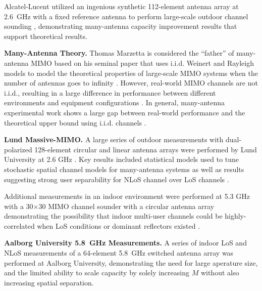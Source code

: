	Alcatel-Lucent utilized an ingenious synthetic 112-element antenna array at 2.6~GHz with a fixed reference antenna to perform large-scale outdoor channel sounding \cite{hoydis2012channel}, demonstrating many-antenna capacity improvement results that support theoretical results.




\textbf{Many-Antenna Theory.}
	Thomas Marzetta is considered the ``father'' of many-antenna \ac{MIMO} based on his seminal paper that uses i.i.d. Weinert and Rayleigh models to model the theoretical properties of large-scale \ac{MIMO} systems when the number of antennas goes to infinity \cite{marzetta2010noncooperative}.
	However, real-world \ac{MIMO} channels are not i.i.d., resulting in a large difference in performance between different environments and equipment configurations \cite{yang2013performance}.
	In general, many-antenna experimental work shows a large gap between real-world performance and the theoretical upper bound using i.i.d. channels \cite{larsson2014massive}.

\textbf{Lund Massive-MIMO.}
A large series of outdoor measurements with dual-polarized 128-element circular and linear antenna arrays were performed by Lund University at 2.6 GHz \cite{gao2015massive}.
Key results included statistical models used to tune stochastic spatial channel models for many-antenna systems \cite{molisch2014propagation} as well as results suggesting strong user separability for \ac{NLoS} channel over \ac{LoS} channels \cite{flordelis2015spatial}.

Additional measurements in an indoor environment were performed at 5.3 GHz with a 30$\times$30 \ac{MIMO} channel sounder with a circular antenna array demonstrating the possibility that indoor multi-user channels could be highly-correlated when \ac{LoS} conditions or dominant reflectors existed \cite{kolmonen2010measurement}.

\textbf{Aalborg University 5.8~GHz Measurements.}
A series of indoor \ac{LoS} and \ac{NLoS} measurements of a 64-element 5.8~GHz switched antenna array \cite{martinez2014towards} was performed at Aalborg University, demonstrating the need for large aperature size, and the limited ability to scale capacity by solely increasing $M$ without also increasing spatial separation.


